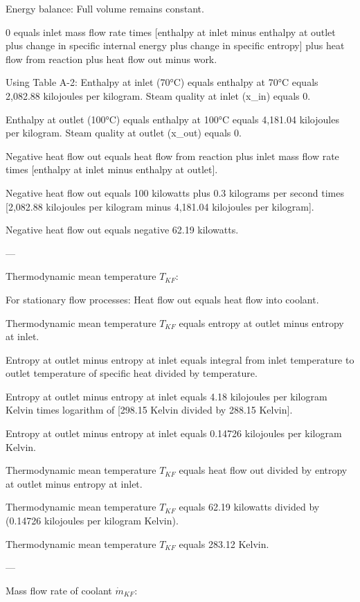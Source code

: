 Energy balance: Full volume remains constant.  

0 equals inlet mass flow rate times [enthalpy at inlet minus enthalpy at outlet plus change in specific internal energy plus change in specific entropy] plus heat flow from reaction plus heat flow out minus work.  

Using Table A-2:  
Enthalpy at inlet (70°C) equals enthalpy at 70°C equals 2,082.88 kilojoules per kilogram.  
Steam quality at inlet (x_in) equals 0.  

Enthalpy at outlet (100°C) equals enthalpy at 100°C equals 4,181.04 kilojoules per kilogram.  
Steam quality at outlet (x_out) equals 0.  

Negative heat flow out equals heat flow from reaction plus inlet mass flow rate times [enthalpy at inlet minus enthalpy at outlet].  

Negative heat flow out equals 100 kilowatts plus 0.3 kilograms per second times [2,082.88 kilojoules per kilogram minus 4,181.04 kilojoules per kilogram].  

Negative heat flow out equals negative 62.19 kilowatts.  

---

Thermodynamic mean temperature \( T_{KF} \):  

For stationary flow processes:  
Heat flow out equals heat flow into coolant.  

Thermodynamic mean temperature \( T_{KF} \) equals entropy at outlet minus entropy at inlet.  

Entropy at outlet minus entropy at inlet equals integral from inlet temperature to outlet temperature of specific heat divided by temperature.  

Entropy at outlet minus entropy at inlet equals 4.18 kilojoules per kilogram Kelvin times logarithm of [298.15 Kelvin divided by 288.15 Kelvin].  

Entropy at outlet minus entropy at inlet equals 0.14726 kilojoules per kilogram Kelvin.  

Thermodynamic mean temperature \( T_{KF} \) equals heat flow out divided by entropy at outlet minus entropy at inlet.  

Thermodynamic mean temperature \( T_{KF} \) equals 62.19 kilowatts divided by (0.14726 kilojoules per kilogram Kelvin).  

Thermodynamic mean temperature \( T_{KF} \) equals 283.12 Kelvin.  

---

Mass flow rate of coolant \( \dot{m}_{KF} \):  

